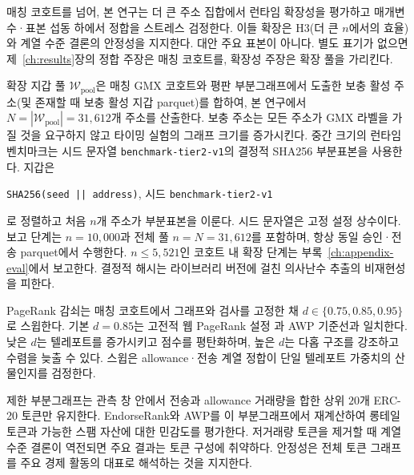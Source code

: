 매칭 코호트를 넘어, 본 연구는 더 큰 주소 집합에서 런타임 확장성을 평가하고 매개변수·표본 섭동 하에서 정합을 스트레스 검정한다. 이들 확장은 H3(더 큰 $n$에서의 효율)와 계열 수준 결론의 안정성을 지지한다. 대안 주요 표본이 아니다. 별도 표기가 없으면 제~\ref{ch:results}장의 정합 주장은 매칭 코호트를, 확장성 주장은 확장 풀을 가리킨다.


확장 지갑 풀 $\mathcal{W}_{\mathrm{pool}}$은 매칭 GMX 코호트와 평판 부분그래프에서 도출한 보충 활성 주소(및 존재할 때 보충 활성 지갑 parquet)를 합하여, 본 연구에서 $N=|\mathcal{W}_{\mathrm{pool}}|=31{,}612$개 주소를 산출한다. 보충 주소는 모든 주소가 GMX 라벨을 가질 것을 요구하지 않고 타이밍 실험의 그래프 크기를 증가시킨다. 중간 크기의 런타임 벤치마크는 시드 문자열 \texttt{benchmark-tier2-v1}의 결정적 SHA256 부분표본을 사용한다. 지갑은
\begin{center}
\texttt{SHA256(seed || address)}, 시드 \texttt{benchmark-tier2-v1}
\end{center}
로 정렬하고 처음 $n$개 주소가 부분표본을 이룬다. 시드 문자열은 고정 설정 상수이다. 보고 단계는 $n=10{,}000$과 전체 풀 $n=N=31{,}612$를 포함하며, 항상 동일 승인·전송 parquet에서 수행한다. $n\le 5{,}521$인 코호트 내 확장 단계는 부록~\ref{ch:appendix-eval}에서 보고한다. 결정적 해시는 라이브러리 버전에 걸친 의사난수 추출의 비재현성을 피한다.


PageRank 감쇠는 매칭 코호트에서 그래프와 검사를 고정한 채 $d\in\{0.75,0.85,0.95\}$로 스윕한다. 기본 $d=0.85$는 고전적 웹 PageRank 설정 과 AWP 기준선과 일치한다. 낮은 $d$는 텔레포트를 증가시키고 점수를 평탄화하며, 높은 $d$는 다홉 구조를 강조하고 수렴을 늦출 수 있다. 스윕은 allowance·전송 계열 정합이 단일 텔레포트 가중치의 산물인지를 검정한다.


제한 부분그래프는 관측 창 안에서 전송과 allowance 거래량을 합한 상위 $20$개 ERC-20 토큰만 유지한다. EndorseRank와 AWP를 이 부분그래프에서 재계산하여 롱테일 토큰과 가능한 스팸 자산에 대한 민감도를 평가한다. 저거래량 토큰을 제거할 때 계열 수준 결론이 역전되면 주요 결과는 토큰 구성에 취약하다. 안정성은 전체 토큰 그래프를 주요 경제 활동의 대표로 해석하는 것을 지지한다.


